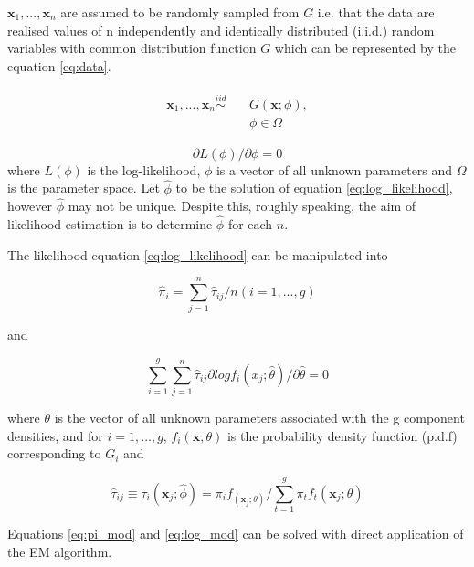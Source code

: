 \documentclass[a4paper]{article}
\begin{document}
$\textbf{x}_1,...,\textbf{x}_n$ are assumed to be randomly sampled from $G$ i.e. that the data are realised values of n independently and identically distributed (i.i.d.) random variables with common distribution function $G$ which can be represented by the equation \ref{eq:data}.

\begin{align}\label{eq:data}
\begin{split}
\textbf{x}_1, ... , \textbf{x}_n \displaystyle  \stackrel{iid}{\sim} \quad &G(\textbf{x}; \phi), \\
&\phi \in \Omega
\end{split}
\end{align}

\begin{equation}\label{eq:log_likelihood}
\partial L(\phi)/ \partial \phi = 0
\end{equation}
where $L(\phi)$ is the log-likelihood, $\phi$ is a vector of all unknown parameters and $\Omega$ is the parameter space. Let $\hat{\phi}$ to be the solution of equation \ref{eq:log_likelihood}, however $\hat{\phi}$ may not be unique. Despite this, roughly speaking, the aim of likelihood estimation is to determine $\hat{\phi}$ for each $n$. 

The likelihood equation \ref{eq:log_likelihood} can be manipulated into

\begin{equation}\label{eq:pi_mod}
\hat{\pi}_i = \sum_{j=1}^{n} \hat{\tau}_{ij} /n (i = 1, ... , g)
\end{equation}

and 

\begin{equation}\label{eq:log_mod}
\sum_{i=1}^g \sum_{j=1}^n \hat{\tau}_{ij} \partial log f_i(x_j;\hat{\theta}) / \partial \hat{\theta} = 0
\end{equation}

where $\theta$ is the vector of all unknown parameters associated with the g component densities, and for $i = 1, ... , g$, $f_i(\textbf{x},\theta)$ is the probability density function (p.d.f) corresponding to $G_i$ and

$$\hat{\tau}_{ij} \equiv \tau_i(\textbf{x}_j;\hat{\phi}) = \pi_i f_(\textbf{x}_j;\theta) / \sum_{t=1}^g \pi_t f_t(\textbf{x}_j;\theta)$$

Equations \ref{eq:pi_mod} and \ref{eq:log_mod} can be solved with direct application of the EM algorithm.
\end{document}
